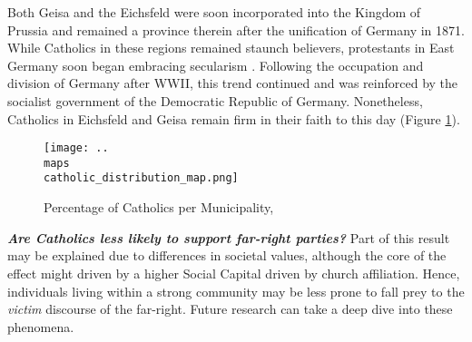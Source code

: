 Both Geisa and the Eichsfeld were soon incorporated into the Kingdom of Prussia and remained a province therein after the unification of Germany in 1871. While Catholics in these regions remained staunch believers, protestants in East Germany soon began embracing secularism \citep{becker2020separation}. Following the occupation and division of Germany after \ac{WWII}, this trend continued and was reinforced by the socialist government of the Democratic Republic of Germany. Nonetheless, Catholics in Eichsfeld and Geisa remain firm in their faith to this day (Figure \ref{fig:catholic}). 

\begin{figure}[hb]
    \centering
        \caption{Percentage of Catholics per Municipality, \citep{zensus2022}}
    \texttt{[image: ..\\maps\\catholic\_distribution\_map.png]}
    \label{fig:catholic}
\end{figure}


\newpage

\textbf{\textit{Are Catholics less likely to support far-right parties?}}
Part of this result may be explained due to differences in societal values, although the core of the effect might driven by a higher Social Capital driven by church affiliation. Hence, individuals living within a strong community may be less prone to fall prey to the \textit{victim} discourse of the far-right. Future research can take a deep dive into these phenomena. 



